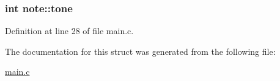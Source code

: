 \hypertarget{structnote_a30832d96c968d682e5838b39370a1908}{
\subsubsection[{tone}]{\setlength{\rightskip}{0pt plus 5cm}int note\+::tone}}\label{structnote_a30832d96c968d682e5838b39370a1908}


Definition at line 28 of file main.\+c.



The documentation for this struct was generated from the following file\+:\begin{DoxyCompactItemize}
\item 
\hyperlink{main_8c}{main.\+c}\end{DoxyCompactItemize}
